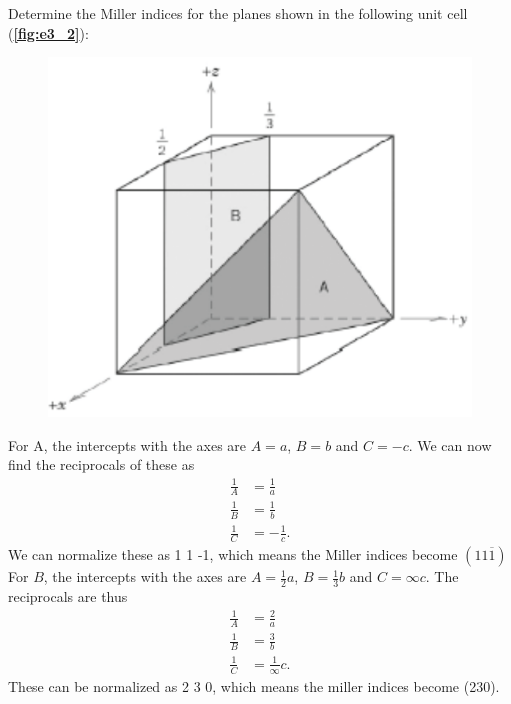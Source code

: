 Determine the Miller indices for the planes shown in the following unit cell (\textbf{\autoref{fig:e3_2}}):
\begin{figure} [ht]
  \centering
  \caption{}
  \includegraphics[width=0.5\linewidth]{../figures/e3_2.png}
  \label{fig:e3_2}
\end{figure}
\bigbreak
For A, the intercepts with the axes are $A = a$, $B = b$ and $C = -c$. We can now find the reciprocals of these as
\begin{align*}
  \frac{1}{A} &= \frac{1}{a} \\
  \frac{1}{B} &= \frac{1}{b} \\
  \frac{1}{C} &= - \frac{1}{c}
.\end{align*}
We can normalize these as 1 1 -1, which means the Miller indices become $(1 1 \overline{1})$
\bigbreak
For $B$, the intercepts with the axes are $A = \frac{1}{2}a$, $B = \frac{1}{3}b$ and $C = \infty c$. The reciprocals are thus
\begin{align*}
  \frac{1}{A} &= \frac{2}{a} \\
  \frac{1}{B} &= \frac{3}{b} \\
  \frac{1}{C} &= \frac{1}{\infty} c
.\end{align*}
These can  be normalized as 2 3 0, which means the miller indices become (230).
